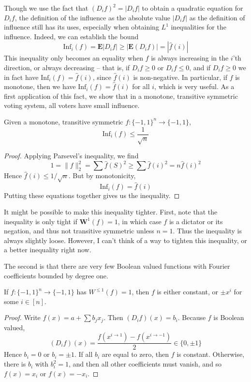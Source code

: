 Though we use the fact that $(D_if)^2 = |D_if|$ to obtain a quadratic equation for $D_i f$, the definition of the influence as the absolute value $|D_if|$ as the definition of influence still has its uses, especially when obtaining $L^1$ inequalities for the influence. Indeed, we can establish the bound
%
\[ \text{Inf}_i(f) = \mathbf{E}|D_if| \geq \left| \mathbf{E}(D_i f) \right| = | \widehat{f}(i) | \]
%
This inequality only becomes an equality when $f$ is always increasing in the $i$'th direction, or always decreasing -- that is, if $D_i f \geq 0$ or $D_i f \leq 0$, and if $D_i f \geq 0$ we in fact have $\text{Inf}_i(f) = \widehat{f}(i)$, since $\widehat{f}(i)$ is non-negative. In particular, if $f$ is monotone, then we have $\text{Inf}_i(f) = \widehat{f}(i)$ for all $i$, which is very useful. As a first application of this fact, we show that in a monotone, transitive symmetric voting system, all voters have small influence.

\begin{theorem}
    Given a monotone, transitive symmetric $f: \{ -1, 1 \}^n \to \{ -1, 1 \}$,
    \[ \text{Inf}_i(f) \leq \frac{1}{\sqrt{n}} \]
\end{theorem}
\begin{proof}
    Applying Parsevel's inequality, we find
    \[ 1 = \| f \|_2^2 = \sum \widehat{f}(S)^2 \geq \sum \widehat{f}(i)^2 = n \widehat{f}(i)^2 \]
    Hence $\widehat{f}(i) \leq 1/\sqrt{n}$. But by monotonicity,
    \[ \text{Inf}_i(f) = \widehat{f}(i) \]
    Putting these equations together gives us the inequality.
\end{proof}

It might be possible to make this inequality tighter. First, note that the inequality is only tight if $\mathbf{W}^1(f) = 1$, in which case $f$ is a dictator or its negation, and thus not transitive symmetric unless $n = 1$. Thus the inequality is always slightly loose. However, I can't think of a way to tighten this inequality, or a better inequality right now.

The second is that there are very few Boolean valued functions with Fourier coefficients bounded by degree one.

\begin{lemma}
    If $f: \{ -1, 1 \}^n \to \{ -1, 1 \}$ has $W^{\leq 1}(f) = 1$, then $f$ is either constant, or $\pm x^i$ for some $i \in [n]$.
\end{lemma}
\begin{proof}
    Write $f(x) = a + \sum b_j x_j$. Then $(D_i f)(x) = b_i$. Because $f$ is Boolean valued,
    \[ (D_i f)(x) = \frac{f(x^{i \to 1}) - f(x^{i \to -1})}{2} \in \{ 0, \pm 1 \} \]
    Hence $b_i = 0$ or $b_i = \pm 1$. If all $b_i$ are equal to zero, then $f$ is constant. Otherwise, there is $b_i$ with $b_i^2 = 1$, and then all other coefficients must vanish, and so $f(x) = x_i$ or $f(x) = -x_i$.
\end{proof}

